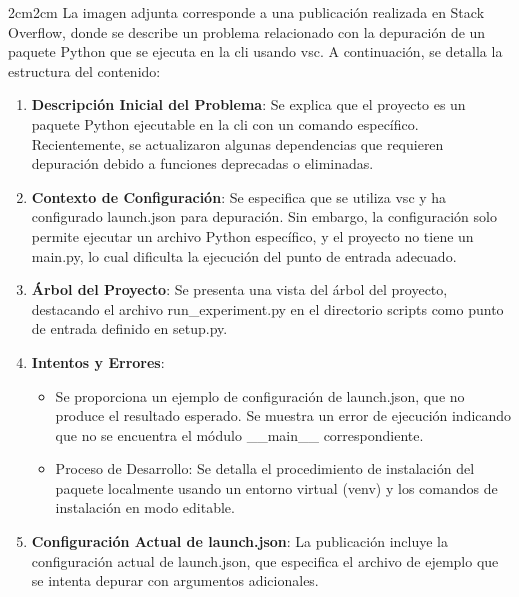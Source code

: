 \begin{adjustwidth}{2cm}{2cm}
    La imagen adjunta corresponde a una publicación realizada en Stack Overflow, donde se describe un problema relacionado con la depuración de un paquete Python que se ejecuta en la \acrfull{cli} usando \acrfull{vsc}. A continuación, se detalla la estructura del contenido:
    \vspace{2mm}
    \begin{enumerate}
        \item \textbf{Descripción Inicial del Problema}: Se explica que el proyecto es un paquete Python ejecutable en la \acrlong{cli} con un comando específico. Recientemente, se actualizaron algunas dependencias que requieren depuración debido a funciones deprecadas o eliminadas.
              \vspace{2mm}

        \item \textbf{Contexto de Configuración}: Se especifica que se utiliza \acrshort{vsc} y ha configurado launch.json para depuración. Sin embargo, la configuración solo permite ejecutar un archivo Python específico, y el proyecto no tiene un main.py, lo cual dificulta la ejecución del punto de entrada adecuado.
              \vspace{2mm}

        \item \textbf{Árbol del Proyecto}: Se presenta una vista del árbol del proyecto, destacando el archivo run\_experiment.py en el directorio scripts como punto de entrada definido en setup.py.
              \vspace{2mm}

        \item \textbf{Intentos y Errores}:
              \begin{itemize}
                  \item     Se proporciona un ejemplo de configuración de launch.json, que no produce el resultado esperado.
                        Se muestra un error de ejecución indicando que no se encuentra el módulo \_\_main\_\_ correspondiente.

                  \item Proceso de Desarrollo: Se detalla el procedimiento de instalación del paquete localmente usando un entorno virtual (venv) y los comandos de instalación en modo editable.
              \end{itemize}

              \vspace{2mm}
        \item \textbf{Configuración Actual de launch.json}: La publicación incluye la configuración actual de launch.json, que especifica el archivo de ejemplo que se intenta depurar con argumentos adicionales.
              \vspace{2mm}


\end{enumerate}
\end{adjustwidth}

